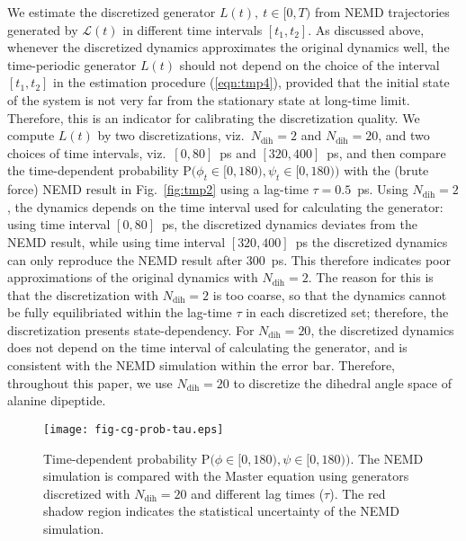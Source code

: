\documentclass[journal=jctcce,manuscript=article]{achemso}
\newcommand{\ml}[0]{\mathcal {L}}
\newcommand{\prob}{\textrm{P}}
\newcommand{\dih}{\textrm{dih}}
\begin{document}
We estimate the discretized generator $L(t), \ t\in[0,T)$
from NEMD trajectories generated by $\ml(t)$ in different time intervals $[t_1,
t_2]$.
As discussed above, whenever  the discretized dynamics approximates the original
dynamics well, the time-periodic generator $L(t)$ should not depend on the choice of the interval $[t_1,t_2]$ in the estimation procedure (\ref{eqn:tmp4}), provided that the initial state of the system
is not very far from the stationary state at long-time limit.
Therefore, this is an indicator for calibrating the discretization quality.
We compute $L(t)$ by two discretizations, viz.~$N_\dih=2$ and $N_\dih=20$, and two
choices of time intervals, viz.~$[0, 80]$~ps and $[320, 400]$~ps, and then
compare the time-dependent probability $\prob\big(\phi_t\in[0,180), \psi_t\in [0,180)\big)$
with the (brute force) NEMD result in Fig.~\ref{fig:tmp2} using a lag-time $\tau=0.5$~ps.
Using $N_\dih=2$, the dynamics depends on the time interval used for
calculating the generator: using time interval $[0, 80]$~ps, the discretized
dynamics deviates from the NEMD result,
while using time interval $[320, 400]$~ps the discretized dynamics can only
reproduce the NEMD result after 300~ps.  This therefore indicates poor 
approximations of the original dynamics with $N_\dih=2$. The reason for this is that the
discretization with $N_\dih=2$ is too coarse, so that the dynamics cannot be fully
equilibriated within the lag-time $\tau$ in each discretized set;
therefore, the discretization presents state-dependency.  For
$N_\dih=20$, the discretized dynamics does not depend on the time interval of
calculating the generator, and is consistent with the
NEMD simulation within the error bar. Therefore, throughout this paper, we use $N_\dih=20$
to discretize  the dihedral angle space of alanine dipeptide.


\begin{figure}
  \centering
  \texttt{[image: fig-cg-prob-tau.eps]}  
  \caption{Time-dependent probability $\prob\big(\phi\in[0,180), \psi\in [0,180)\big)$.  The NEMD simulation is compared with the Master equation using generators discretized with $N_\dih=20$ and different lag times ($\tau$). The red shadow region indicates the
    statistical uncertainty of the NEMD simulation.}
  \label{fig:tmp3}
\end{figure}
\end{document}
